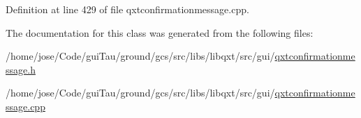 Definition at line 429 of file qxtconfirmationmessage.\-cpp.



The documentation for this class was generated from the following files\-:\begin{DoxyCompactItemize}
\item 
/home/jose/\-Code/gui\-Tau/ground/gcs/src/libs/libqxt/src/gui/\hyperlink{qxtconfirmationmessage_8h}{qxtconfirmationmessage.\-h}\item 
/home/jose/\-Code/gui\-Tau/ground/gcs/src/libs/libqxt/src/gui/\hyperlink{qxtconfirmationmessage_8cpp}{qxtconfirmationmessage.\-cpp}\end{DoxyCompactItemize}
